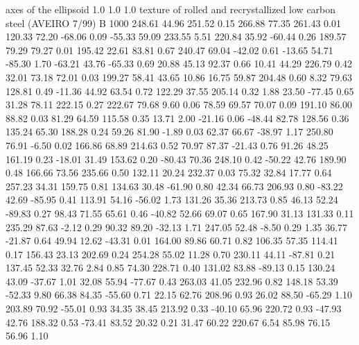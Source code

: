 axes of the ellipsoid
  1.0  1.0  1.0
texture of rolled and recrystallized low carbon steel (AVEIRO 7/99)
B   1000
  248.61   44.96  251.52    0.15
  266.88   77.35  261.43    0.01
  120.33   72.20  -68.06    0.09
  -55.33   59.09  233.55    5.51
  220.84   35.92  -60.44    0.26
  189.57   79.29   79.27    0.01
  195.42   22.61   83.81    0.67
  240.47   69.04  -42.02    0.61
  -13.65   54.71  -85.30    1.70
  -63.21   43.76  -65.33    0.69
   20.88   45.13   92.37    0.66
   10.41   44.29  226.79    0.42
   32.01   73.18   72.01    0.03
  199.27   58.41   43.65   10.86
   16.75   59.87  204.48    0.60
    8.32   79.63  128.81    0.49
  -11.36   44.92   63.54    0.72
  122.29   37.55  205.14    0.32
    1.88   23.50  -77.45    0.65
   31.28   78.11  222.15    0.27
  222.67   79.68    9.60    0.06
   78.59   69.57   70.07    0.09
  191.10   86.00   88.82    0.03
   81.29   64.59  115.58    0.35
   13.71    2.00  -21.16    0.06
  -48.44   82.78  128.56    0.36
  135.24   65.30  188.28    0.24
   59.26   81.90   -1.89    0.03
   62.37   66.67  -38.97    1.17
  250.80   76.91   -6.50    0.02
  166.86   68.89  214.63    0.52
   70.97   87.37  -21.43    0.76
   91.26   48.25  161.19    0.23
  -18.01   31.49  153.62    0.20
  -80.43   70.36  248.10    0.42
  -50.22   42.76  189.90    0.48
  166.66   73.56  235.66    0.50
  132.11   20.24  232.37    0.03
   75.32   32.84   17.77    0.64
  257.23   34.31  159.75    0.81
  134.63   30.48  -61.90    0.80
   42.34   66.73  206.93    0.80
  -83.22   42.69  -85.95    0.41
  113.91   54.16  -56.02    1.73
  131.26   35.36  213.73    0.85
   46.13   52.24  -89.83    0.27
   98.43   71.55   65.61    0.46
  -40.82   52.66   69.07    0.65
  167.90   31.13  131.33    0.11
  235.29   87.63   -2.12    0.29
   90.32   89.20  -32.13    1.71
  247.05   52.48   -8.50    0.29
    1.35   36.77  -21.87    0.64
   49.94   12.62  -43.31    0.01
  164.00   89.86   60.71    0.82
  106.35   57.35  114.41    0.17
  156.43   23.13  202.69    0.24
  254.28   55.02   11.28    0.70
  230.11   44.11  -87.81    0.21
  137.45   52.33   32.76    2.84
    0.85   74.30  228.71    0.40
  131.02   83.88  -89.13    0.15
  130.24   43.09  -37.67    1.01
   32.08   55.94  -77.67    0.43
  263.03   41.05  232.96    0.82
  148.18   53.39  -52.33    9.80
   66.38   84.35  -55.60    0.71
   22.15   62.76  208.96    0.93
   26.02   88.50  -65.29    1.10
  203.89   70.92  -55.01    0.93
   34.35   38.45  213.92    0.33
  -40.10   65.96  220.72    0.93
  -47.93   42.76  188.32    0.53
  -73.41   83.52   20.32    0.21
   31.47   60.22  220.67    6.54
   85.98   76.15   56.96    1.10
